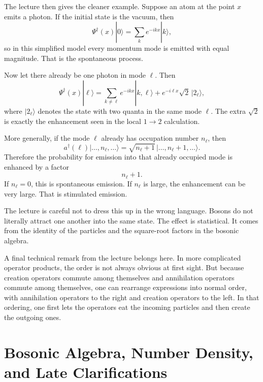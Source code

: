 The lecture then gives the cleaner example. Suppose an atom at the point \(x\) emits a photon. If the initial state is the vacuum, then
\begin{equation}
\Psi^\dagger(x)|0\rangle
=
\sum_k e^{-ikx}|k\rangle,
\end{equation}
so in this simplified model every momentum mode is emitted with equal magnitude. That is the spontaneous process.

Now let there already be one photon in mode \(\ell\). Then
\begin{equation}
\Psi^\dagger(x)|\ell\rangle
=
\sum_{k\neq \ell} e^{-ikx}|k,\ell\rangle
+
e^{-i\ell x}\sqrt{2}\,|2_\ell\rangle,
\end{equation}
where \(|2_\ell\rangle\) denotes the state with two quanta in the same mode \(\ell\). The extra \(\sqrt{2}\) is exactly the enhancement seen in the local \(1\to 2\) calculation.

More generally, if the mode \(\ell\) already has occupation number \(n_\ell\), then
\begin{equation}
a^\dagger(\ell)\big|\ldots,n_\ell,\ldots\big\rangle
=
\sqrt{n_\ell+1}\,
\big|\ldots,n_\ell+1,\ldots\big\rangle.
\end{equation}
Therefore the probability for emission into that already occupied mode is enhanced by a factor
\begin{equation}
n_\ell+1.
\end{equation}
If \(n_\ell=0\), this is spontaneous emission. If \(n_\ell\) is large, the enhancement can be very large. That is stimulated emission.

The lecture is careful not to dress this up in the wrong language. Bosons do not literally attract one another into the same state. The effect is statistical. It comes from the identity of the particles and the square-root factors in the bosonic algebra.

A final technical remark from the lecture belongs here. In more complicated operator products, the order is not always obvious at first sight. But because creation operators commute among themselves and annihilation operators commute among themselves, one can rearrange expressions into normal order, with annihilation operators to the right and creation operators to the left. In that ordering, one first lets the operators eat the incoming particles and then create the outgoing ones.

\section{Bosonic Algebra, Number Density, and Late Clarifications}

